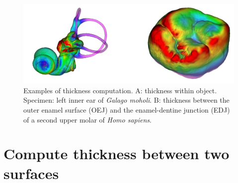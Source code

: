 \begin{figure}
  \centering
  \includegraphics[scale=0.28]{images/11/thickness_examples.png} 
	\caption{
Examples of thickness computation. A: thickness within object. Specimen: left inner ear of \textit{Galago moholi}. B: thickness between the outer enamel surface (OEJ) and the enamel-dentine junction (EDJ) of a second upper molar of \textit{Homo sapiens}.}
\label{thickness_examples}
 
\end{figure}




\section{Compute thickness between two surfaces}

